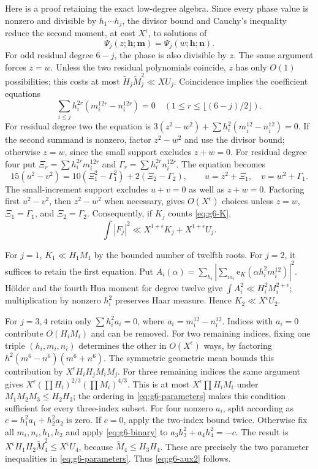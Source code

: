 \documentclass[11pt,reqno]{amsart}
\numberwithin{equation}{section}
\theoremstyle{definition}
\begin{document}
Here is a proof retaining the exact low-degree algebra.  Since every phase value
is nonzero and divisible by $h_1\cdots h_j$, the divisor bound and Cauchy's
inequality reduce the second moment, at cost $X^\epsilon$, to solutions of
\[
 \Psi_j(z;\mathbf h;\mathbf m)=\Psi_j(w;\mathbf h;\mathbf n).
\]
For odd residual degree $6-j$, the phase is also divisible by $z$.
The same argument forces $z=w$.  Unless the two residual polynomials coincide,
$z$ has only $O(1)$ possibilities; this costs at most
$\widetilde H_j\widetilde M_j^2\ll XU_j$.
Coincidence implies the coefficient equations
\begin{equation}\label{eq:g6-K}
 \sum_{i\le j}h_i^{2r}(m_i^{12r}-n_i^{12r})=0
 \quad(1\le r\le\lfloor(6-j)/2\rfloor).
\end{equation}
For residual degree two the equation is
$3(z^2-w^2)+\sum h_i^2(m_i^{12}-n_i^{12})=0$.
If the second summand is nonzero, factor $z^2-w^2$ and use the divisor bound;
otherwise $z=w$, since the small support excludes $z+w=0$.
For residual degree four put
$\Xi_r=\sum h_i^{2r}m_i^{12r}$ and
$\Gamma_r=\sum h_i^{2r}n_i^{12r}$.
The equation becomes
\[
 15(u^2-v^2)=10(\Xi_1^2-\Gamma_1^2)+2(\Xi_2-\Gamma_2),
 \qquad u=z^2+\Xi_1,\quad v=w^2+\Gamma_1.
\]
The small-increment support excludes $u+v=0$ as well as $z+w=0$.
Factoring first $u^2-v^2$, then $z^2-w^2$ when necessary, gives
$O(X^\epsilon)$ choices unless $z=w$, $\Xi_1=\Gamma_1$, and
$\Xi_2=\Gamma_2$.  Consequently, if $K_j$ counts \eqref{eq:g6-K},
\begin{equation}\label{eq:g6-reduction}
 \int|F_j|^2\ll X^{1+\epsilon}K_j+X^{1+\epsilon}U_j.
\end{equation}

For $j=1$, $K_1\ll H_1M_1$ by the bounded number of twelfth roots.
For $j=2$, it suffices to retain the first equation.  Put
$A_i(\alpha)=\sum_{h_i}|\sum_{m_i}\mathrm e_K(\alpha h_i^2m_i^{12})|^2$.
H\"older and the fourth Hua moment for degree twelve give
$\int A_i^2\ll H_i^2M_i^{2+\epsilon}$; multiplication by nonzero $h_i^2$
preserves Haar measure.  Hence $K_2\ll X^\epsilon U_2$.

For $j=3,4$ retain only
$\sum h_i^2a_i=0$, where $a_i=m_i^{12}-n_i^{12}$.
Indices with $a_i=0$ contribute $O(H_iM_i)$ and can be removed.
For two remaining indices, fixing one triple $(h_i,m_i,n_i)$ determines the
other in $O(X^\epsilon)$ ways, by factoring
$h^2(m^6-n^6)(m^6+n^6)$.
The symmetric geometric mean bounds this contribution by
$X^\epsilon H_iH_jM_iM_j$.
For three remaining indices the same argument gives
$X^\epsilon(\prod H_i)^{2/3}(\prod M_i)^{4/3}$.
This is at most $X^\epsilon\prod H_iM_i$ under
$M_1M_2M_3\le H_2H_3$; the ordering in \eqref{eq:g6-parameters} makes this
condition sufficient for every three-index subset.
For four nonzero $a_i$, split according as
$c=h_1^2a_1+h_2^2a_2$ is zero.  If $c=0$, apply the two-index bound twice.
Otherwise fix all $m_i,n_i,h_1,h_2$ and apply \eqref{eq:g6-binary} to
$a_3h_3^2+a_4h_4^2=-c$.
The result is
$X^\epsilon H_1H_2\widetilde M_4^2\le X^\epsilon U_4$,
because $\widetilde M_4\le H_3H_4$.
These are precisely the two parameter inequalities in
\eqref{eq:g6-parameters}.  Thus \eqref{eq:g6-aux2} follows.
\end{document}

